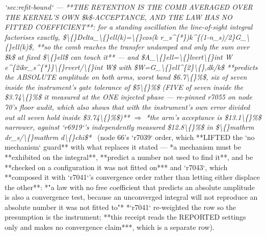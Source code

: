 \begin{description}
\textit{`sec:refit-bound` --- **THE RETENTION IS THE COMB AVERAGED OVER THE KERNEL'S OWN \$k\$-ACCEPTANCE, AND THE LAW HAS NO FITTED COEFFICIENT**: for a standing oscillation the line-of-sight integral factorises exactly, \$\textbackslash\{\}Delta\_\textbackslash\{\}ell(k)=\textbackslash\{\}cos(k r\_s\textasciicircum{}\{*\})k\textasciicircum{}\{(1-n\_s)/2\}G\_\textbackslash\{\}ell(k)\$, **so the comb reaches the transfer undamped and only the sum over \$k\$ at fixed \$\textbackslash\{\}ell\$ can touch it** --- and \$A\_\textbackslash\{\}ell=\textbackslash\{\}lvert\textbackslash\{\}int W e\textasciicircum{}\{2ikr\_s\textasciicircum{}\{*\}\}\textbackslash\{\}rvert/\textbackslash\{\}int W\$ with \$W=G\_\textbackslash\{\}ell\textasciicircum{}\{2\}\textbackslash\{\},dk/k\$ **predicts the ABSOLUTE amplitude on both arms, worst band \$6.7\textbackslash\{\}\%\$, six of seven inside the instrument's gate tolerance of \$5\textbackslash\{\}\%\$ (FIVE of seven inside the \$3.74\textbackslash\{\}\%\$ it measured at the ONE injected phase --- re-pinned r7055 on node 70's floor audit, which also shows that with the instrument's own error divided out all seven hold inside \$3.74\textbackslash\{\}\%\$)** \ensuremath{\Rightarrow} *the arm's acceptance is \$13.1\textbackslash\{\}\%\$ narrower, against `r6919`'s independently measured \$12.8\textbackslash\{\}\%\$ in \$\textbackslash\{\}mathrm dr\_s/\textbackslash\{\}mathrm d\textbackslash\{\}chi\$*} \ (node 66's `r7039` order, which **LIFTED the `no mechanism` guard** with what replaces it stated --- *a mechanism must be **exhibited on the integral**, **predict a number not used to find it**, and be **checked on a configuration it was not fitted on***  and `r7043`, which **composed it with `r7041`'s convergence order rather than letting either displace the other**: *"a law with no free coefficient that predicts an absolute amplitude is also a convergence test, because an unconverged integral will not reproduce an absolute number it was not fitted to"*  *`r7041` re-weighted the row so the presumption is the instrument; **this receipt reads the REPORTED settings only and makes no convergence claim***, which is a separate row). 

\end{description}

